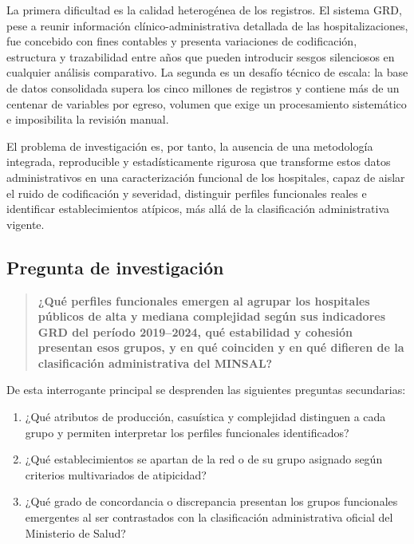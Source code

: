 La primera dificultad es la calidad heterogénea de los registros. El sistema
GRD, pese a reunir información clínico-administrativa detallada de las
hospitalizaciones, fue concebido con fines contables y presenta variaciones de
codificación, estructura y trazabilidad entre años que pueden introducir sesgos
silenciosos en cualquier análisis comparativo. La segunda es un desafío técnico
de escala: la base de datos consolidada supera los cinco millones de registros y
contiene más de un centenar de variables por egreso, volumen que exige un
procesamiento sistemático e imposibilita la revisión manual.

El problema de investigación es, por tanto, la ausencia de una metodología
integrada, reproducible y estadísticamente rigurosa que transforme estos datos
administrativos en una caracterización funcional de los hospitales, capaz de
aislar el ruido de codificación y severidad, distinguir perfiles funcionales
reales e identificar establecimientos atípicos, más allá de la clasificación
administrativa vigente.

\subsection{Pregunta de investigación}
\label{sec:pregunta}

\begin{quote}
\textbf{¿Qué perfiles funcionales emergen al agrupar los hospitales públicos de
alta y mediana complejidad según sus indicadores GRD del período 2019--2024, qué
estabilidad y cohesión presentan esos grupos, y en qué coinciden y en qué
difieren de la clasificación administrativa del MINSAL?}
\end{quote}

De esta interrogante principal se desprenden las siguientes preguntas
secundarias:

\begin{enumerate}
  \item ¿Qué atributos de producción, casuística y complejidad distinguen a
        cada grupo y permiten interpretar los perfiles funcionales
        identificados?
  \item ¿Qué establecimientos se apartan de la red o de su grupo asignado
        según criterios multivariados de atipicidad?
  \item ¿Qué grado de concordancia o discrepancia presentan los grupos funcionales 
        emergentes al ser contrastados con la clasificación administrativa oficial 
        del Ministerio de Salud?
\end{enumerate}

